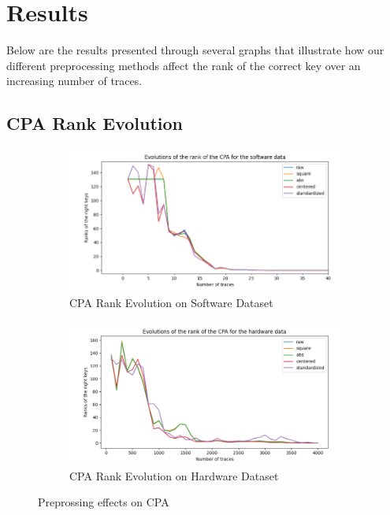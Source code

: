 \documentclass[a4paper,10pt]{article}
\begin{document}
\section{Results}
Below are the results presented through several graphs that illustrate how our different preprocessing methods affect the rank of the correct key over an increasing number of traces.

\subsection{CPA Rank Evolution}
\begin{figure}[h]
    \begin{subfigure}{.5\textwidth}
    \centering
      \includegraphics[width=1\linewidth]{CPA_software.png}
      \caption{CPA Rank Evolution on Software Dataset}
      \label{CPAsoftware}
    \end{subfigure}%
    \begin{subfigure}{.5\textwidth}
    \centering
      \includegraphics[width=1\linewidth]{CPA_hardware.png}
      \caption{CPA Rank Evolution on Hardware Dataset}
      \label{CPAhardware}
    \end{subfigure}
    \caption{Preprossing effects on CPA}
\end{figure}
\end{document}
